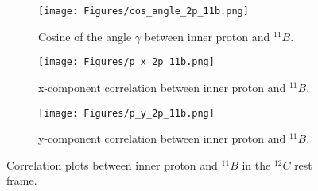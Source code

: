 \begin{figure}[!htb]
    \centering
    \begin{subfigure}[b]{0.9\textwidth}
        \centering
        \texttt{[image: Figures/cos\_angle\_2p\_11b.png]} %
        \caption{Cosine of the angle $\gamma$ between inner proton and $^{11}B$.}
        \label{fig:cos_gamma}
    \end{subfigure}

    \vspace{0.3cm} %

    \begin{subfigure}[b]{0.39\textwidth}
        \centering
        \texttt{[image: Figures/p\_x\_2p\_11b.png]} %
        \caption{x-component correlation between inner proton and $^{11}B$.}
        \label{fig:x_corr_p_miss_11b}
    \end{subfigure}
    \hspace{0.2cm} %
    \begin{subfigure}[b]{0.39\textwidth}
        \centering
        \texttt{[image: Figures/p\_y\_2p\_11b.png]} %
        \caption{y-component correlation between inner proton and $^{11}B$.}
        \label{fig:y_corr_p_miss_11b}
    \end{subfigure}

    
    \caption{Correlation plots between inner proton and $^{11}B$ in the $^{12}C$ rest frame.}
    \label{fig:corr_p_miss_11b}
\end{figure}

